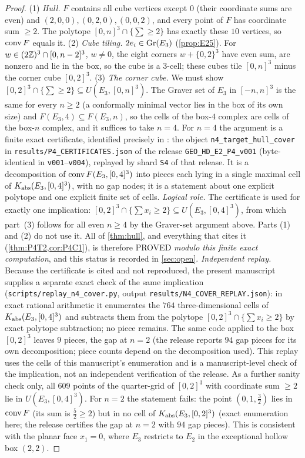 \begin{proof}
(1) \emph{Hull.} $F$ contains all cube vertices except $0$ (their coordinate sums are even) and $(2,0,0),(0,2,0),(0,0,2)$, and every point of $F$ has coordinate sum $\ge2$. The polytope $[0,n]^3\cap\{\sum\ge2\}$ has exactly these $10$ vertices, so $\operatorname{conv} F$ equals it.
(2) \emph{Cube tiling.} $2e_i\in\operatorname{Gr}(E_3)$ (\cref{prop:E25}). For $w\in(2\mathbb Z)^3\cap[0,n-2]^3$, $w\ne0$, the eight corners $w+\{0,2\}^3$ have even sum, are nonzero and lie in the box, so the cube is a $3$-cell; these cubes tile $[0,n]^3$ minus the corner cube $[0,2]^3$.
(3) \emph{The corner cube.} We must show $[0,2]^3\cap\{\sum\ge2\}\subseteq U(E_3,[0,n]^3)$. The Graver set of $E_3$ in $[-n,n]^3$ is the same for every $n\ge2$ (a conformally minimal vector lies in the box of its own size) and $F(E_3,4)\subseteq F(E_3,n)$, so the cells of the box-$4$ complex are cells of the box-$n$ complex, and it suffices to take $n=4$. For $n=4$ the argument is a finite exact certificate, identified precisely in \cite{HD1P4}: the object \texttt{n4\_target\_hull\_cover} in \texttt{results/P4\_CERTIFICATES.json} of the release \texttt{GEO\_HD\_E2\_P4\_v001} (byte-identical in \texttt{v001}--\texttt{v004}), replayed by shard \texttt{S4} of that release. It is a decomposition of $\operatorname{conv} F(E_3,[0,4]^3)$ into pieces each lying in a single maximal cell of $K_{\mathrm{abs}}(E_3,[0,4]^3)$, with no gap nodes; it is a statement about one explicit polytope and one explicit finite set of cells. \emph{Logical role.} The certificate is used for exactly one implication: $[0,2]^3\cap\{\sum x_i\ge2\}\subseteq U(E_3,[0,4]^3)$, from which part~(3) follows for all even $n\ge4$ by the Graver-set argument above. Parts (1) and (2) do not use it. All of \cref{thm:hull}, and everything that cites it (\cref{thm:P4T2,cor:P4C1}), is therefore PROVED \emph{modulo this finite exact computation}, and this status is recorded in \cref{sec:open}. \emph{Independent replay.} Because the certificate is cited and not reproduced, the present manuscript supplies a separate exact check of the same implication (\texttt{scripts/replay\_n4\_cover.py}, output \texttt{results/N4\_COVER\_REPLAY.json}): in exact rational arithmetic it enumerates the $764$ three-dimensional cells of $K_{\mathrm{abs}}(E_3,[0,4]^3)$ and subtracts them from the polytope $[0,2]^3\cap\{\sum x_i\ge2\}$ by exact polytope subtraction; no piece remains. The same code applied to the box $[0,2]^3$ leaves $9$ pieces, the gap at $n=2$ (the release reports $94$ gap pieces for its own decomposition; piece counts depend on the decomposition used). This replay uses the cells of this manuscript's enumeration and is a manuscript-level check of the implication, not an independent verification of the release. As a further sanity check only, all $609$ points of the quarter-grid of $[0,2]^3$ with coordinate sum $\ge2$ lie in $U(E_3,[0,4]^3)$. For $n=2$ the statement fails: the point $(0,1,\tfrac32)$ lies in $\operatorname{conv} F$ (its sum is $\tfrac52\ge2$) but in no cell of $K_{\mathrm{abs}}(E_3,[0,2]^3)$ (exact enumeration here; the release certifies the gap at $n=2$ with $94$ gap pieces). This is consistent with the planar face $x_1=0$, where $E_3$ restricts to $E_2$ in the exceptional hollow box $(2,2)$. \qedhere
\end{proof}
